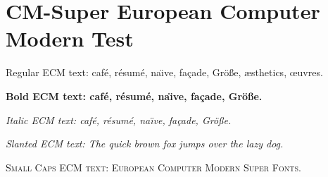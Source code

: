 \documentclass{article}
\begin{document}
\section{CM-Super European Computer Modern Test}

Regular ECM text: caf\'e, r\'esum\'e, na\"\i ve, fa\c{c}ade, Gr\"o\ss e, \ae sthetics, \oe uvres.

\textbf{Bold ECM text: caf\'e, r\'esum\'e, na\"\i ve, fa\c{c}ade, Gr\"o\ss e.}

\textit{Italic ECM text: caf\'e, r\'esum\'e, na\"\i ve, fa\c{c}ade, Gr\"o\ss e.}

\textsl{Slanted ECM text: The quick brown fox jumps over the lazy dog.}

\textsc{Small Caps ECM text: European Computer Modern Super Fonts.}
\end{document}
